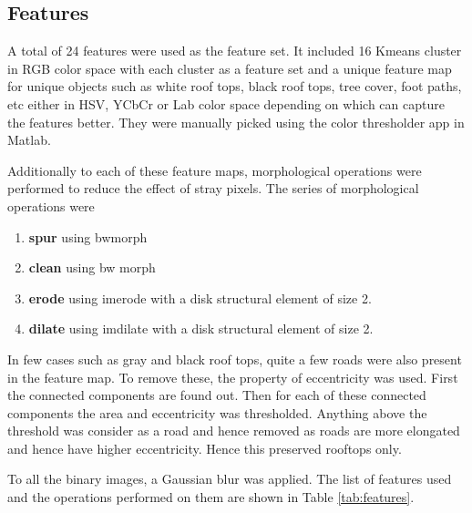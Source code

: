 \documentclass[fleqn,10pt]{SelfArx} %
\begin{document}
\subsection{Features}
A total of 24 features were used as the feature set. It included 16 Kmeans cluster in RGB color space with each cluster as a feature set and a unique feature map for unique objects such as white roof tops, black roof tops, tree cover, foot paths, etc either in HSV, YCbCr or Lab color space depending on which can capture the features better. They were manually picked using the color thresholder app in Matlab. 

Additionally to each of these feature maps, morphological operations were performed to reduce the effect of stray pixels. The series of morphological operations were
\begin{enumerate}
\itemsep-0.2em 
\item \textbf{spur} using bwmorph
\item \textbf{clean} using bw morph
\item \textbf{erode} using imerode with a disk structural element of size 2.
\item \textbf{dilate} using imdilate with a disk structural element of size 2.
\end{enumerate}

In few cases such as gray and black roof tops, quite a few roads were also present in the feature map. To remove these, the property of eccentricity was used. First the connected components are found out. Then for each of these connected components the area and eccentricity was thresholded. Anything above the threshold was consider as a road and hence removed as roads are more elongated and hence have higher eccentricity. Hence this preserved rooftops only.

To all the binary images, a Gaussian blur was applied. The list of features used and the operations performed on them are shown in Table \ref{tab:features}.
\end{document}
